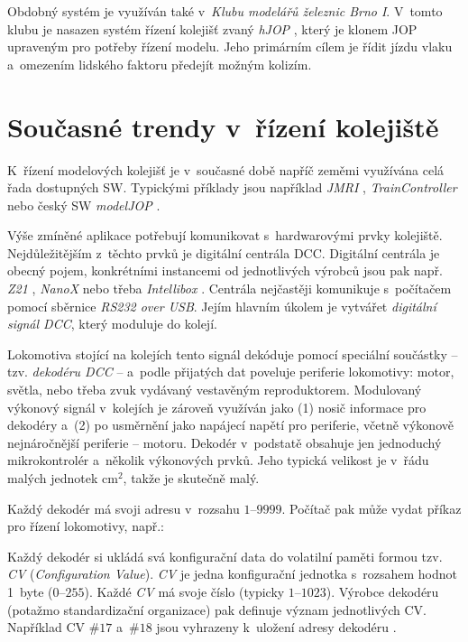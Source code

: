 Obdobný systém je využíván také v~\textit{Klubu modelářů železnic Brno I}.
V~tomto klubu je nasazen systém řízení kolejišť zvaný \textit{hJOP}
\cite{hjop:web}, který je klonem JOP upraveným pro potřeby řízení modelu. Jeho
primárním cílem je řídit jízdu vlaku a~omezením lidského faktoru předejít
možným kolizím.

\section{Současné trendy v~řízení kolejiště}
\label{sec:trendy}

K~řízení modelových kolejišť je v~současné době napříč zeměmi využívána celá
řada dostupných SW. Typickými příklady jsou například \textit{JMRI}
\cite{jmri:web}, \textit{TrainController} \cite{traincontroller:web}
nebo český SW \textit{modelJOP} \cite{modeljop:web}.

Výše zmíněné aplikace potřebují komunikovat s~hardwarovými prvky kolejiště.
Nejdůležitějším z~těchto prvků je digitální centrála DCC. Digitální centrála je
obecný pojem, konkrétními instancemi od jednotlivých výrobců jsou pak např.
\textit{Z21} \cite{z21:web}, \textit{NanoX} \cite{nanox:web} nebo třeba
\textit{Intellibox} \cite{intellibox:web}. Centrála nejčastěji komunikuje
s~počítačem pomocí sběrnice \textit{RS232 over USB}. Jejím hlavním úkolem je
vytvářet \textit{digitální signál DCC}, který moduluje do kolejí.

Lokomotiva stojící na kolejích tento signál dekóduje pomocí spe\-ciál\-ní
součástky -- tzv. \textit{dekodéru DCC} -- a~podle přijatých dat poveluje
periferie lokomotivy: motor, světla, nebo třeba zvuk vydávaný vestavěným
reproduktorem. Modulovaný výkonový signál v~kolejích je zároveň využíván jako
(1) nosič informace pro dekodéry a~(2) po usměrnění jako napájecí napětí pro
periferie, včetně výkonově nejnáročnější periferie -- motoru. Dekodér
v~podstatě obsahuje jen jednoduchý mikrokontrolér a~několik výkonových prvků.
Jeho typická velikost je v~řádu malých jednotek cm$^2$, takže je skutečně malý.

Každý dekodér má svoji adresu v~rozsahu $1$--$9999$. Počítač pak může vydat příkaz
pro řízení lokomotivy, např.: \textit{}

Každý dekodér si ukládá svá konfigurační data do volatilní paměti formou tzv.
\textit{CV} (\textit{Configuration Value}). \textit{CV} je jedna konfigurační
jednotka s~rozsahem hodnot 1~byte ($0$--$255$). Každé \textit{CV} má svoje číslo
(typicky $1$--$1023$). Výrobce dekodéru (potažmo standardizační organizace) pak
definuje význam jednotlivých CV. Například CV $\#17$ a~$\#18$ jsou vyhrazeny
k~uložení adresy dekodéru \cite{zimo:cvs}.

